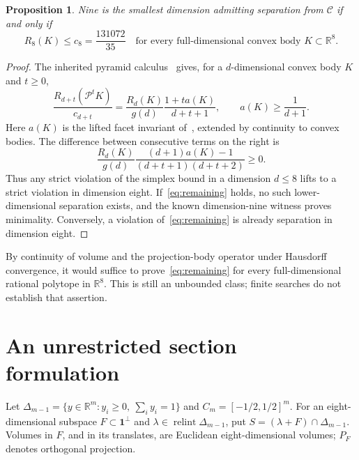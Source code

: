 \documentclass[11pt,a4paper]{article}
\newcommand{\CC}{\mathcal C}
\newtheorem{proposition}{Proposition}
\begin{document}
\begin{proposition}\label{prop:global}
Nine is the smallest dimension admitting separation from $\CC$ if and
only if
\begin{equation}\label{eq:remaining}
 R_8(K)\le c_8=\frac{131072}{35}
 \quad\text{for every full-dimensional convex body }K\subset\mathbb R^8.
\end{equation}
\end{proposition}
\begin{proof}
The inherited pyramid calculus~\cite[Sections 2--5]{calculus} gives,
for a $d$-dimensional convex body $K$ and $t\ge0$,
\[
 \frac{R_{d+t}(\mathcal P^tK)}{c_{d+t}}
 =\frac{R_d(K)}{g(d)}\frac{1+t a(K)}{d+t+1},
 \qquad a(K)\ge\frac1{d+1}.
\]
Here $a(K)$ is the lifted facet invariant of~\cite{calculus}, extended
by continuity to convex bodies.
The difference between consecutive terms on the right is
\[
 \frac{R_d(K)}{g(d)}
 \frac{(d+1)a(K)-1}{(d+t+1)(d+t+2)}\ge0.
\]
Thus any strict violation of the simplex bound in a dimension $d\le8$
lifts to a strict violation in dimension eight. If~\eqref{eq:remaining}
holds, no such lower-dimensional separation exists, and the known
dimension-nine witness proves minimality. Conversely, a violation
of~\eqref{eq:remaining} is already separation in dimension eight.
\end{proof}

By continuity of volume and the projection-body operator under Hausdorff
convergence, it would suffice to prove~\eqref{eq:remaining} for every
full-dimensional rational polytope in $\mathbb R^8$. This is still an
unbounded class; finite searches do not establish that assertion.

\section{An unrestricted section formulation}
Let $\Delta_{m-1}=\{y\in\mathbb R^m:y_i\ge0,\ \sum_i y_i=1\}$ and
$C_m=[-1/2,1/2]^m$. For an eight-dimensional subspace
$F\subset\boldsymbol1^\perp$ and $\lambda\in\operatorname{relint}\Delta_{m-1}$,
put $S=(\lambda+F)\cap\Delta_{m-1}$. Volumes in $F$, and in its translates,
are Euclidean eight-dimensional volumes; $P_F$ denotes orthogonal projection.
\end{document}
